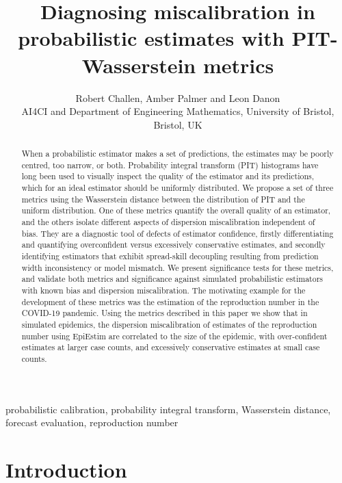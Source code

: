 \documentclass[twoside,11pt,hyphens]{article}
\begin{document}
\title{Diagnosing miscalibration in probabilistic estimates with PIT-Wasserstein metrics}
\author{\name Robert Challen, Amber Palmer and Leon Danon\\
\addr AI4CI and Department of Engineering Mathematics, University of Bristol, Bristol, UK}
\maketitle

\begin{abstract}
When a probabilistic estimator makes a set of predictions, the estimates may be poorly centred, too narrow, or both. Probability integral transform (PIT) histograms have long been used to visually inspect the quality of the estimator and its predictions, which for an ideal estimator should be uniformly distributed. We propose a set of three metrics using the Wasserstein distance between the distribution of PIT and the uniform distribution. One of these metrics quantify the overall quality of an estimator, and the others isolate different aspects of dispersion miscalibration independent of bias. They are a diagnostic tool of defects of estimator confidence, firstly differentiating and quantifying overconfident versus excessively conservative estimates, and secondly identifying estimators that exhibit spread-skill decoupling resulting from prediction width inconsistency or model mismatch. We present significance tests for these metrics, and validate both metrics and significance against simulated probabilistic estimators with known bias and dispersion miscalibration. The motivating example for the development of these metrics was the estimation of the reproduction number in the COVID-19 pandemic. Using the metrics described in this paper we show that in simulated epidemics, the dispersion miscalibration of estimates of the reproduction number using EpiEstim are correlated to the size of the epidemic, with over-confident estimates at larger case counts, and excessively conservative estimates at small case counts.
\end{abstract}

\begin{keywords}
probabilistic calibration, probability integral transform, Wasserstein distance, forecast evaluation, reproduction number
\end{keywords}

\section{Introduction}
\end{document}

